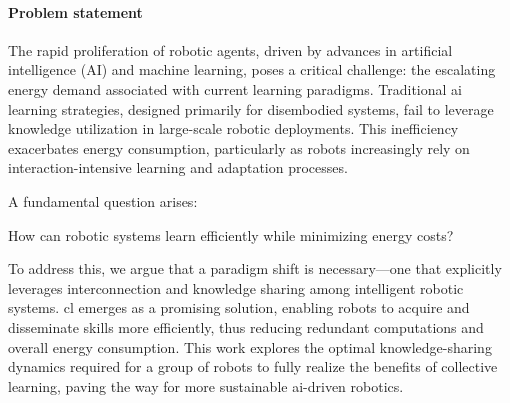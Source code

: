 \documentclass[12pt]{article}
\newtheorem{assumption}{Assumption}
\begin{document}

\paragraph*{\textbf{Problem statement}}
The rapid proliferation of robotic agents, driven by advances in artificial intelligence (AI) and machine learning, poses a critical challenge: the escalating energy demand associated with current learning paradigms. Traditional \ac{ai} learning strategies, designed primarily for disembodied systems, fail to leverage knowledge utilization in large-scale robotic deployments. This inefficiency exacerbates energy consumption, particularly as robots increasingly rely on interaction-intensive learning and adaptation processes.

A fundamental question arises:
\begin{tcolorbox}
		How can robotic systems learn efficiently while minimizing energy costs?
\end{tcolorbox}
\noindent To address this, we argue that a paradigm shift is necessary---one that explicitly leverages interconnection and knowledge sharing among intelligent robotic systems. \Ac{cl} emerges as a promising solution, enabling robots to acquire and disseminate skills more efficiently, thus reducing redundant computations and overall energy consumption. This work explores the optimal knowledge-sharing dynamics required for a group of robots to fully realize the benefits of collective learning, paving the way for more sustainable \ac{ai}-driven robotics.
\end{document}
